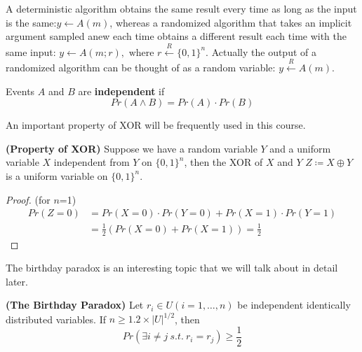 A deterministic algorithm obtains the same result every time as long as the input is the same:$y\leftarrow A(m)$, whereas a randomized algorithm that takes an implicit argument sampled anew each time obtains a different result each time with the same input: $y\leftarrow A(m;r),\text{ where } r\xleftarrow{R}\{0,1\}^n$. Actually the output of a randomized algorithm can be thought of as a random variable: $y\xleftarrow{R}A(m)$.

\begin{definition}
Events $A$ and $B$ are \textbf{independent} if \
\[Pr(A\land B)=Pr(A)\cdot Pr(B)\]
\end{definition}

An important property of XOR will be frequently used in this course.
\begin{theorem}\textbf{(Property of XOR)}
Suppose we have a random variable $Y$ and a uniform variable $X$ independent from $Y$ on $\{0,1\}^n$, then the XOR of $X$ and $Y$ $Z\coloneqq X\oplus Y$ is a uniform variable on $\{0,1\}^n$.
\end{theorem}
\begin{proof}(for $n$=1)
\begin{equation*}
\begin{split}
Pr(Z=0) &=Pr(X=0)\cdot Pr(Y=0) + Pr(X=1)\cdot Pr(Y=1)\\
        &=\frac{1}{2}\left(Pr(X=0) + Pr(X=1)\right)=\frac{1}{2}
\end{split}
\end{equation*}
\end{proof}

The birthday paradox is an interesting topic that we will talk about in detail later.
\begin{theorem}\textbf{(The Birthday Paradox)}
Let $r_i\in U(i=1,\dots,n)$ be independent identically distributed variables. If $n\geq 1.2\times\lvert U\rvert^{1/2}$, then 
\[Pr(\exists i\neq j\:s.t.\:r_i=r_j)\geq\frac{1}{2}\]
\end{theorem}
\ifx\PREAMBLE\undefined

\fi